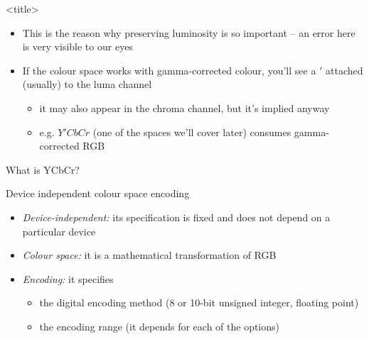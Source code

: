 \documentclass[aspectratio=169,handout,usepdftitle=false]{fireshonks}
\begin{document}
\begin{frame}{<title>}
\begin{itemize}
    \item This is the reason why preserving luminosity is so important -- an error here is very visible to our eyes
    \item If the colour space works with gamma-corrected colour, you'll see a $'$ attached (usually) to the luma channel
    \begin{itemize}
        \item it may also appear in the chroma channel, but it's implied anyway
        \item e.g. $Y'CbCr$ (one of the spaces we'll cover later) consumes gamma-corrected RGB
    \end{itemize}
\end{itemize}
\end{frame}
\begin{frame}{What is YCbCr?}
    \begin{center}
        Device independent colour space encoding
    \end{center}

    \begin{itemize}[<+(1)->]
        \item \emph{Device-independent:} its specification is fixed and does not depend on a particular device
        \item \emph{Colour space:} it is a mathematical transformation of RGB
        \item \emph{Encoding:} it specifies
              \begin{itemize}
                  \item the digital encoding method (8 or 10-bit unsigned integer, floating point)
                  \item the encoding range (it depends for each of the options)
              \end{itemize}
    \end{itemize}
\end{frame}
\end{document}
